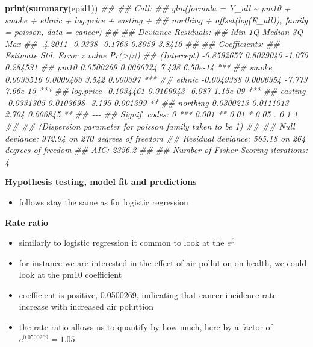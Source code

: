 \documentclass[
]{book}
\newenvironment{Shaded}{\begin{snugshade}}{\end{snugshade}}
\newcommand{\CommentTok}[1]{\textcolor[rgb]{0.56,0.35,0.01}{\textit{#1}}}
\newcommand{\KeywordTok}[1]{\textcolor[rgb]{0.13,0.29,0.53}{\textbf{#1}}}
\newcommand{\NormalTok}[1]{#1}
\providecommand{\tightlist}{%
  \setlength{\itemsep}{0pt}\setlength{\parskip}{0pt}}
\theoremstyle{definition}
\theoremstyle{definition}
\theoremstyle{definition}
\theoremstyle{remark}
\begin{document}
\begin{Shaded}
\begin{Highlighting}[]
\KeywordTok{print}\NormalTok{(}\KeywordTok{summary}\NormalTok{(epid1))}
\CommentTok{\#\# }
\CommentTok{\#\# Call:}
\CommentTok{\#\# glm(formula = Y\_all \textasciitilde{} pm10 + smoke + ethnic + log.price + easting + }
\CommentTok{\#\#     northing + offset(log(E\_all)), family = poisson, data = cancer)}
\CommentTok{\#\# }
\CommentTok{\#\# Deviance Residuals: }
\CommentTok{\#\#     Min       1Q   Median       3Q      Max  }
\CommentTok{\#\# {-}4.2011  {-}0.9338  {-}0.1763   0.8959   3.8416  }
\CommentTok{\#\# }
\CommentTok{\#\# Coefficients:}
\CommentTok{\#\#               Estimate Std. Error z value Pr(\textgreater{}|z|)    }
\CommentTok{\#\# (Intercept) {-}0.8592657  0.8029040  {-}1.070 0.284531    }
\CommentTok{\#\# pm10         0.0500269  0.0066724   7.498 6.50e{-}14 ***}
\CommentTok{\#\# smoke        0.0033516  0.0009463   3.542 0.000397 ***}
\CommentTok{\#\# ethnic      {-}0.0049388  0.0006354  {-}7.773 7.66e{-}15 ***}
\CommentTok{\#\# log.price   {-}0.1034461  0.0169943  {-}6.087 1.15e{-}09 ***}
\CommentTok{\#\# easting     {-}0.0331305  0.0103698  {-}3.195 0.001399 ** }
\CommentTok{\#\# northing     0.0300213  0.0111013   2.704 0.006845 ** }
\CommentTok{\#\# {-}{-}{-}}
\CommentTok{\#\# Signif. codes:  0 \textquotesingle{}***\textquotesingle{} 0.001 \textquotesingle{}**\textquotesingle{} 0.01 \textquotesingle{}*\textquotesingle{} 0.05 \textquotesingle{}.\textquotesingle{} 0.1 \textquotesingle{} \textquotesingle{} 1}
\CommentTok{\#\# }
\CommentTok{\#\# (Dispersion parameter for poisson family taken to be 1)}
\CommentTok{\#\# }
\CommentTok{\#\#     Null deviance: 972.94  on 270  degrees of freedom}
\CommentTok{\#\# Residual deviance: 565.18  on 264  degrees of freedom}
\CommentTok{\#\# AIC: 2356.2}
\CommentTok{\#\# }
\CommentTok{\#\# Number of Fisher Scoring iterations: 4}
\end{Highlighting}
\end{Shaded}

\textbf{Hypothesis testing, model fit and predictions}

\begin{itemize}
\tightlist
\item
  follows stay the same as for logistic regression
\end{itemize}

\textbf{Rate ratio}

\begin{itemize}
\tightlist
\item
  similarly to logistic regression it common to look at the \(e^\beta\)
\item
  for instance we are interested in the effect of air pollution on health, we could look at the pm10 coefficient
\item
  coefficient is positive, 0.0500269, indicating that cancer incidence rate increase with increased air poluttion
\item
  the rate ratio allows us to quantify by how much, here by a factor of \(e^{0.0500269} = 1.05\)
\end{itemize}
\end{document}
